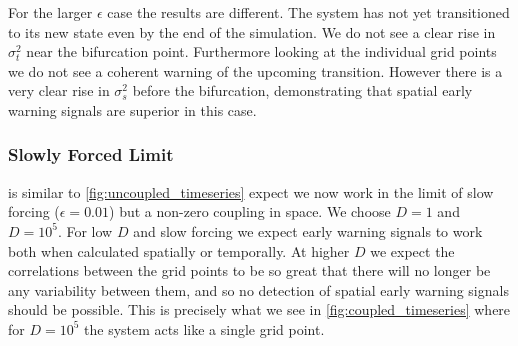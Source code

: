     For the larger $\epsilon$ case the results are different. The system has not yet transitioned to
    its new state even by the end of the simulation. We do not see a clear rise in $\sigma_t^2$ near the bifurcation point. Furthermore looking at the individual grid points
    we do not see a coherent warning of the upcoming transition. However there is a very clear rise in $\sigma_s^2$ before the bifurcation, demonstrating that spatial early warning
    signals are superior in this case.

    \subsubsection{Slowly Forced Limit}
     is similar to \cref{fig:uncoupled_timeseries} expect we now work in the limit of slow forcing ($\epsilon = 0.01$) but
    a non-zero coupling in space. We choose $D = 1$ and $D = 10^5$. For low $D$ and slow forcing we expect early warning signals to work both when calculated spatially or
    temporally. At higher $D$ we expect the correlations between the grid points to be so great that there will no longer be any variability between them, and so no detection
    of spatial early warning signals should be possible. This is precisely what we see in \cref{fig:coupled_timeseries} where for $D=10^5$ the system acts like a single grid point.
